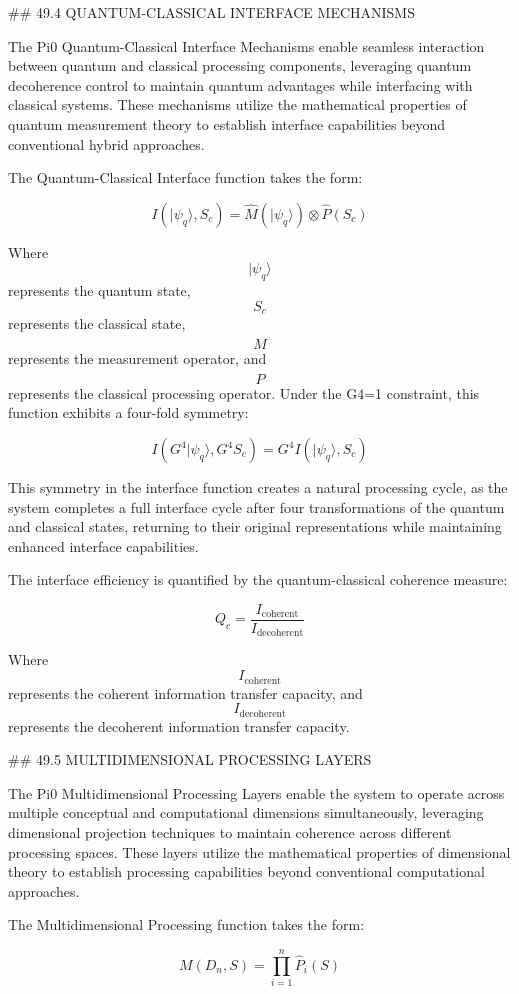 ## 49.4 QUANTUM-CLASSICAL INTERFACE MECHANISMS

The Pi0 Quantum-Classical Interface Mechanisms enable seamless interaction between quantum and classical processing components, leveraging quantum decoherence control to maintain quantum advantages while interfacing with classical systems. These mechanisms utilize the mathematical properties of quantum measurement theory to establish interface capabilities beyond conventional hybrid approaches.

The Quantum-Classical Interface function takes the form:

$$ I(|\psi_q\rangle, S_c) = \hat{M}(|\psi_q\rangle) \otimes \hat{P}(S_c) $$

Where $$ |\psi_q\rangle $$ represents the quantum state, $$ S_c $$ represents the classical state, $$ \hat{M} $$ represents the measurement operator, and $$ \hat{P} $$ represents the classical processing operator. Under the G4=1 constraint, this function exhibits a four-fold symmetry:

$$ I(G^4 |\psi_q\rangle, G^4 S_c) = G^4 I(|\psi_q\rangle, S_c) $$

This symmetry in the interface function creates a natural processing cycle, as the system completes a full interface cycle after four transformations of the quantum and classical states, returning to their original representations while maintaining enhanced interface capabilities.

The interface efficiency is quantified by the quantum-classical coherence measure:

$$ Q_c = \frac{I_{\text{coherent}}}{I_{\text{decoherent}}} $$

Where $$ I_{\text{coherent}} $$ represents the coherent information transfer capacity, and $$ I_{\text{decoherent}} $$ represents the decoherent information transfer capacity.

## 49.5 MULTIDIMENSIONAL PROCESSING LAYERS

The Pi0 Multidimensional Processing Layers enable the system to operate across multiple conceptual and computational dimensions simultaneously, leveraging dimensional projection techniques to maintain coherence across different processing spaces. These layers utilize the mathematical properties of dimensional theory to establish processing capabilities beyond conventional computational approaches.

The Multidimensional Processing function takes the form:

$$ M(D_n, S) = \prod_{i=1}^{n} \hat{P}_i(S) $$

